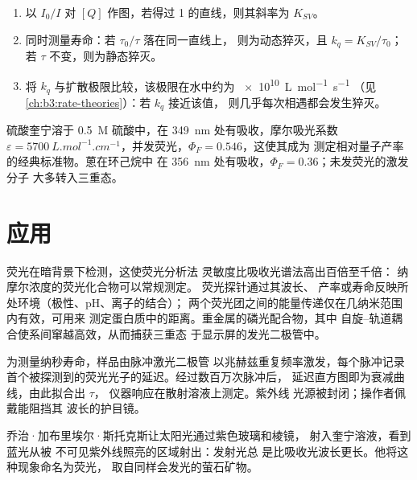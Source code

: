 \begin{method}[猝灭数据的分析]\label{met:b3:electronic-spectroscopy:stern-volmer}
\begin{enumerate}
  \item 以 $I_0/I$ 对 $[Q]$ 作图，若得过 1 的直线，则其斜率为 $K_{SV}$。
  \item 同时测量寿命：若 $\tau_0/\tau$ 落在同一直线上，
        则为动态猝灭，且 $k_q = K_{SV}/\tau_0$；若 $\tau$ 不变，则为静态猝灭。
  \item 将 $k_q$ 与扩散极限比较，该极限在水中约为 \qty{e10}{L.mol^{-1}.s^{-1}}
        （见\cref{ch:b3:rate-theories}）：若 $k_q$ 接近该值，
        则几乎每次相遇都会发生猝灭。
\end{enumerate}
\end{method}

\begin{example}[奎宁与蒽]\label{ex:b3:electronic-spectroscopy:quinine}
硫酸奎宁溶于 \qty{0.5}{M} 硫酸中，在 \qty{349}{nm} 处有吸收，摩尔吸光系数 $\varepsilon =
\qty{5700}{L.mol^{-1}.cm^{-1}}$，并发荧光，$\Phi_F = 0.546$，这使其成为
测定相对量子产率的经典标准物。蒽在环己烷中
在 \qty{356}{nm} 处有吸收，$\Phi_F = 0.36$；未发荧光的激发分子
大多转入三重态。
\end{example}

\section{应用}

荧光在暗背景下检测，这使荧光分析法
灵敏度比吸收光谱法高出百倍至千倍：
纳摩尔浓度的荧光化合物可以常规测定。
荧光探针通过其波长、
产率或寿命反映所处环境（极性、pH、离子的结合）；
两个荧光团之间的能量传递仅在几纳米范围内有效，可用来
测定蛋白质中的距离。重金属的磷光配合物，其中
自旋–轨道耦合使系间窜越高效，从而捕获三重态
于显示屏的发光二极管中。

\begin{inthelab}[时间相关单光子计数]
为测量纳秒寿命，样品由脉冲激光二极管
以兆赫兹重复频率激发，每个脉冲记录
首个被探测到的荧光光子的延迟。经过数百万次脉冲后，
延迟直方图即为衰减曲线，由此拟合出 $\tau$，
仪器响应在散射溶液上测定。紫外线
光源被封闭；操作者佩戴能阻挡其
波长的护目镜。
\end{inthelab}

\begin{history}[斯托克斯，1852 年]
乔治·加布里埃尔·斯托克斯让太阳光通过紫色玻璃和棱镜，
射入奎宁溶液，看到蓝光从被
不可见紫外线照亮的区域射出：发射光总
是比吸收光波长更长。他将这种现象命名为荧光，
取自同样会发光的萤石矿物。
\end{history}

